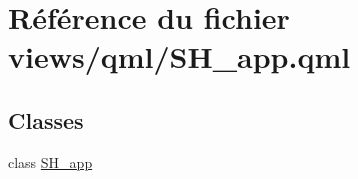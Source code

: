 \hypertarget{SH__app_8qml}{\section{Référence du fichier views/qml/\-S\-H\-\_\-app.qml}
\label{SH__app_8qml}
}
\subsection*{Classes}
\begin{DoxyCompactItemize}
\item 
class \hyperlink{classSH__app}{S\-H\-\_\-app}
\end{DoxyCompactItemize}

